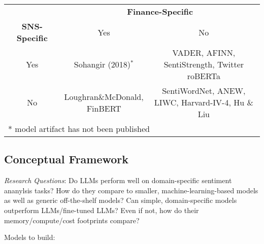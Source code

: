 \begin{table}[!ht]
\centering
\begin{tabular}{ccc}
	\toprule
	& \multicolumn{2}{c}{\textbf{Finance-Specific}} \\
	\cmidrule(l){2-3}
	\textbf{SNS-Specific} & Yes & No\\
	\midrule
	Yes & Sohangir (2018)$^*$ & \makecell{VADER, AFINN,\\ SentiStrength, Twitter roBERTa} \\[15pt]
	No & \makecell{Loughran\&McDonald,\\ FinBERT} & \makecell{SentiWordNet, ANEW,\\ LIWC, Harvard-IV-4, Hu \& Liu}\\
	\bottomrule
	\multicolumn{3}{l}{\footnotesize{* model artifact has not been published}}
\end{tabular}
\end{table}





\subsection{Conceptual Framework}



\emph{Research Questions}: Do LLMs perform well on domain-specific sentiment ananylsis tasks? How do they compare to smaller, machine-learning-based models as well as generic off-the-shelf models? Can simple, domain-specific models outperform LLMs/fine-tuned LLMs? Even if not, how do their memory/compute/cost footprints compare? 

Models to build:










